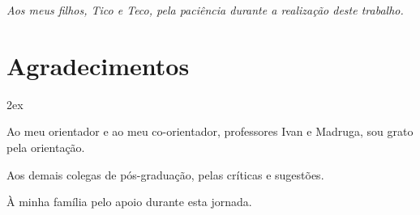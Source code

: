 %
%


\begin{titlepage}

\vspace*{\fill}

\hfill
\begin{minipage}{0.5\linewidth}
\begin{flushright}
\large\it
Aos meus filhos, Tico e Teco, pela paciência durante
a realização deste trabalho.
\end{flushright}
\end{minipage}

\vspace*{\fill}

\end{titlepage}

%
%


\chapter*{Agradecimentos}
\thispagestyle{empty}

\begin{trivlist}  \itemsep 2ex

\item Ao meu orientador e ao meu co-orientador, professores Ivan e Madruga, sou grato pela orientação.



\item Aos demais colegas de pós-graduação, pelas críticas e sugestões.

\item À minha família pelo apoio durante esta jornada.


\end{trivlist}
